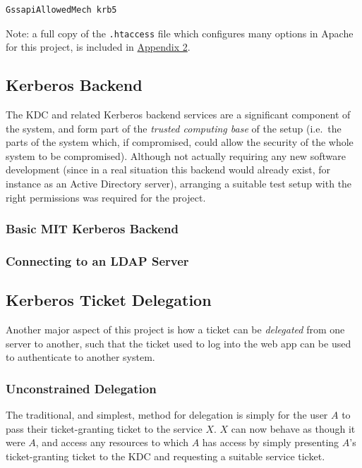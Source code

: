 \documentclass{article}
\begin{document}
\begin{verbatim}
GssapiAllowedMech krb5
\end{verbatim}

Note: a full copy of the \verb+.htaccess+ file which configures many options in Apache for this project, is included in \hyperref[sec:appendix2]{Appendix 2}.

\subsection{Kerberos Backend}
The KDC and related Kerberos backend services are a significant component of the system, and form part of the \textit{trusted computing base} of the setup (i.e.\ the parts of the system which, if compromised, could allow the security of the whole system to be compromised). Although not actually requiring any new software development (since in a real situation this backend would already exist, for instance as an Active Directory server), arranging a suitable test setup with the right permissions was required for the project.

\subsubsection{Basic MIT Kerberos Backend}


\subsubsection{Connecting to an LDAP Server}

\subsection{Kerberos Ticket Delegation}
Another major aspect of this project is how a ticket can be \textit{delegated} from one server to another, such that the ticket used to log into the web app can be used to authenticate to another system.

\subsubsection{Unconstrained Delegation}
The traditional, and simplest, method for delegation is simply for the user $A$ to pass their ticket-granting ticket to the service $X$. $X$ can now behave as though it were $A$, and access any resources to which $A$ has access by simply presenting $A$'s ticket-granting ticket to the KDC and requesting a suitable service ticket\cite{JohnKol-unconstrained-deleg}.
\end{document}
